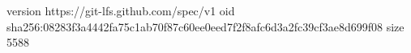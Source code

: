 version https://git-lfs.github.com/spec/v1
oid sha256:08283f3a4442fa75c1ab70f87c60ee0eed7f2f8afc6d3a2fc39cf3ae8d699f08
size 5588
